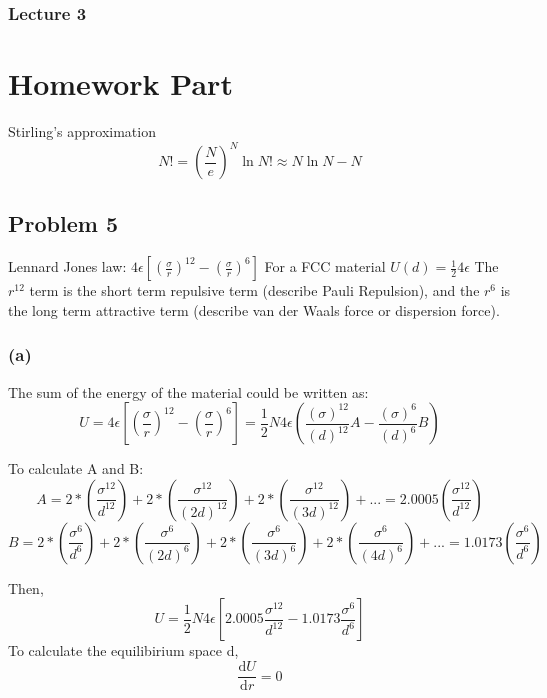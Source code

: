 \documentclass[a4paper]{article}
\begin{document}
\subsubsection{Lecture 3}

\bigskip
\section{Homework Part}
Stirling's approximation 
\begin{equation}
	N! = (\frac{N}{e})^{N}
	\ln N! \approx N\ln N- N
\end{equation}
\subsection{Problem 5}
Lennard Jones law: $4 \epsilon [(\frac{\sigma}{r})^{12}-(\frac{\sigma}{r})^{6}]$
For a FCC material $U(d)=\frac{1}{2} 4 \epsilon $
\newline
The $r^{12}$ term is the short term repulsive term (describe Pauli Repulsion), and the $r^{6}$ is the long term attractive term (describe van der Waals force or dispersion force).

\subsubsection{(a)}
The sum of the energy of the material could be written as: 
\begin{equation}
	U=4\epsilon [(\frac{\sigma}{r})^{12}-(\frac{\sigma}{r})^{6}]=\frac{1}{2}N 4\epsilon (\frac{(\sigma)^{12}}{(d)^{12}}A-\frac{(\sigma)^{6}}{(d)^{6}}B)
\end{equation}

To calculate A and B:
\begin{equation}
	A=2*(\frac{\sigma^{12}}{d^{12}}) + 2*(\frac{\sigma^{12}}{(2d)^{12}}) + 2*(\frac{\sigma^{12}}{(3d)^{12}})+...=2.0005 (\frac{\sigma^{12}}{d^{12}})
\end{equation}
\begin{equation}
	B=2*(\frac{\sigma^{6}}{d^{6}}) + 2*(\frac{\sigma^{6}}{(2d)^{6}}) + 2*(\frac{\sigma^{6}}{(3d)^{6}})+2*(\frac{\sigma^{6}}{(4d)^{6}})+... = 1.0173 (\frac{\sigma^{6}}{d^{6}})
\end{equation}

Then,
\begin{equation}
	U=\frac{1}{2}N 4 \epsilon [2.0005 \frac{\sigma^12}{d^12}-1.0173 \frac{\sigma^6}{d^6}]
\end{equation}
To calculate the equilibirium space d, 
\begin{equation}
	\frac{\mathrm{d} U}{\mathrm{d}r}=0
\end{equation}
\end{document}
